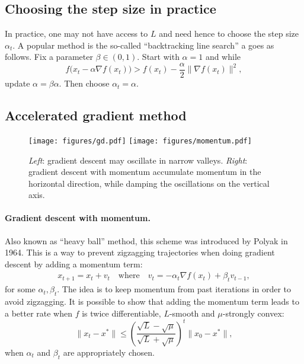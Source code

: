 \documentclass[11pt,nocut]{article}
\begin{document}
\subsection{Choosing the step size in practice}

In practice, one may not have access to $L$ and need hence to choose the step size $\alpha_t$. A popular method is the so-called ``backtracking line search'' a goes as follows.
Fix a parameter $\beta \in (0,1)$.
Start with $\alpha = 1$ and while
$$
f\big(x_t - \alpha \nabla f (x_t) \big) > f(x_t) - \frac{\alpha}{2} \|\nabla f(x_t) \|^2,
$$
update $\alpha =\beta \alpha$. Then choose $\alpha_t = \alpha$.

\subsection{Accelerated gradient method}

\begin{figure}[H]
	\begin{center}
		\texttt{[image: figures/gd.pdf]}
		\hspace{7mm}
		\texttt{[image: figures/momentum.pdf]}
		\caption{\emph{Left}: gradient descent may oscillate in narrow valleys. \emph{Right}: gradient descent with momentum accumulate momentum in the horizontal direction, while damping the oscillations on the vertical axis.}
	\end{center}
\end{figure}
\paragraph{Gradient descent with momentum.}

Also known as ``heavy ball'' method, this scheme was introduced by Polyak in 1964.
This is a way to prevent zigzagging trajectories when doing gradient descent by adding a momentum term:
\begin{align*}
	x_{t+1} = x_t + v_t
	\quad \text{where} \quad
	v_t =  - \alpha_t \nabla f(x_{t}) + \beta_t v_{t-1},
\end{align*}
for some $\alpha_t,\beta_t$. The idea is to keep momentum from past iterations in order to avoid zigzagging. It is possible to show that adding the momentum term leads to a better rate when $f$ is twice differentiable, $L$-smooth and $\mu$-strongly convex:
$$
\|x_t - x^*\| \leq \left(\frac{\sqrt{L}-\sqrt{\mu}}{\sqrt{L} + \sqrt{\mu}}\right)^{\! t} \|x_0 - x^*\|,
$$
when $\alpha_t$ and $\beta_t$ are appropriately chosen.
\end{document}
